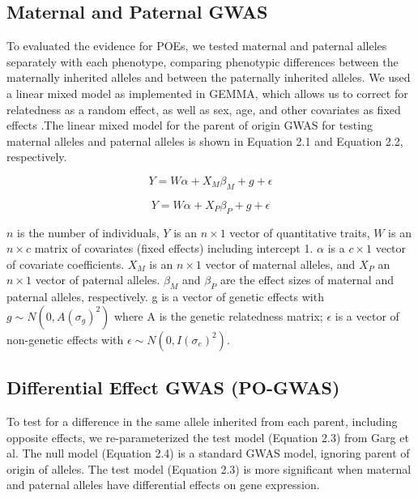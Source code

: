 \subsection{Maternal and Paternal GWAS}\label{Maternal and Paternal GWAS Methods}
To evaluated the evidence for POEs, we tested maternal and paternal alleles separately with each phenotype, comparing phenotypic differences between the maternally inherited alleles and between the paternally inherited alleles. We used a linear mixed model as implemented in GEMMA, which allows us to correct for relatedness as a random effect, as well as sex, age, and other covariates as fixed effects \cite{Zhou2012}.The linear mixed model for the parent of origin GWAS for testing maternal alleles and paternal alleles is shown in Equation 2.1 and Equation 2.2, respectively. 

\begin{equation}
Y =W\alpha + X_{M}\beta_{M}+g+\epsilon
\end{equation}

\begin{equation}
Y =W\alpha + X_{P}\beta_{P}+g+\epsilon
\end{equation}

$n$ is the number of individuals, $Y$ is an $n \times 1$ vector of quantitative traits, $W$ is an $n \times c$ matrix of covariates (fixed effects) including intercept 1. $\alpha$ is a $c \times 1$ vector of covariate coefficients. $X_M$  is an $n \times 1$ vector of maternal alleles, and $X_P$ an $n \times 1$ vector of paternal alleles. $\beta_M$ and $\beta_P$ are the effect sizes of maternal and paternal alleles, respectively. g is a vector of genetic effects with $g \sim N(0, A(\sigma_g)^2 )$ where A is the genetic relatedness matrix; $\epsilon$ is a vector of non-genetic effects with $\epsilon \sim N(0,I(\sigma_e)^2)$.

\subsection{Differential Effect GWAS (PO-GWAS)}\label{Differential Effect GWAS (PO-GWAS)}
To test for a difference in the same allele inherited from each parent, including opposite effects, we re-parameterized the test model (Equation 2.3) from Garg et al\cite{Garg2012a}. The null model (Equation 2.4) is a standard GWAS model, ignoring parent of origin of alleles. The test model (Equation 2.3) is more significant when maternal and paternal alleles have differential effects on gene expression.


